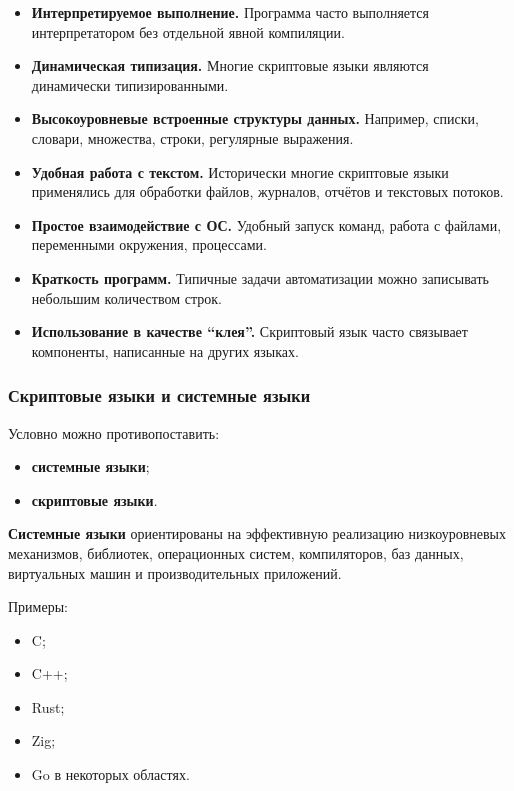 \documentclass[12pt,a4paper]{article}
\begin{document}
\begin{itemize}
    \item \textbf{Интерпретируемое выполнение.}
    Программа часто выполняется интерпретатором без отдельной явной компиляции.

    \item \textbf{Динамическая типизация.}
    Многие скриптовые языки являются динамически типизированными.

    \item \textbf{Высокоуровневые встроенные структуры данных.}
    Например, списки, словари, множества, строки, регулярные выражения.

    \item \textbf{Удобная работа с текстом.}
    Исторически многие скриптовые языки применялись для обработки файлов, журналов,
    отчётов и текстовых потоков.

    \item \textbf{Простое взаимодействие с ОС.}
    Удобный запуск команд, работа с файлами, переменными окружения, процессами.

    \item \textbf{Краткость программ.}
    Типичные задачи автоматизации можно записывать небольшим количеством строк.

    \item \textbf{Использование в качестве ``клея''.}
    Скриптовый язык часто связывает компоненты, написанные на других языках.
\end{itemize}

\subsubsection{Скриптовые языки и системные языки}

Условно можно противопоставить:

\begin{itemize}
    \item \textbf{системные языки};
    \item \textbf{скриптовые языки}.
\end{itemize}

\textbf{Системные языки} ориентированы на эффективную реализацию низкоуровневых
механизмов, библиотек, операционных систем, компиляторов, баз данных, виртуальных
машин и производительных приложений.

Примеры:

\begin{itemize}
    \item C;
    \item C++;
    \item Rust;
    \item Zig;
    \item Go в некоторых областях.
\end{itemize}
\end{document}
